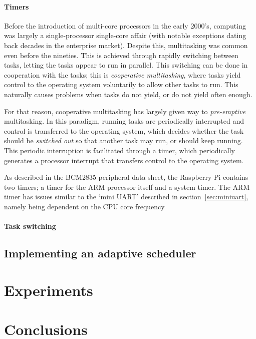 \documentclass[twoside]{uva-inf-bachelor-thesis}
\begin{document}
\subsubsection{Timers}
Before the introduction of multi-core processors in the early 2000's, computing was largely a single-processor single-core affair (with notable exceptions dating back decades in the enterprise market). Despite this, multitasking was common even before the nineties. This is achieved through rapidly switching between tasks, letting the tasks appear to run in parallel. This switching can be done in cooperation with the tasks; this is  \textit{cooperative multitasking}, where tasks yield control to the operating system voluntarily to allow other tasks to run. This naturally causes problems when tasks do not yield, or do not yield often enough.

For that reason, cooperative multitasking has largely given way to \textit{pre-emptive} multitasking. In this paradigm, running tasks are periodically interrupted and control is transferred to the operating system, which decides whether the task should be \textit{switched out} so that another task may run, or should keep running. This periodic interruption is facilitated through a timer, which periodically generates a processor interrupt that transfers control to the operating system.

As described in the BCM2835 peripheral data sheet, the Raspberry Pi contains two timers; a timer for the ARM processor itself and a system timer. The ARM timer has issues similar to the `mini UART' described in section~\ref{sec:miniuart}, namely being dependent on the CPU core frequency


\subsubsection{Task switching}

\section{Implementing an adaptive scheduler}

\chapter{Experiments}

\chapter{Conclusions}

\printbibliography
\end{document}
